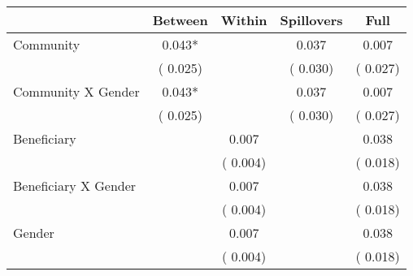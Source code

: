 
\begin{tabular}{l*{4}{c}}\hline&\multicolumn{1}{c}{Between}&\multicolumn{1}{c}{Within}&\multicolumn{1}{c}{Spillovers}&\multicolumn{1}{c}{Full}\\ \hline
 Community                                     &              0.043*      &                                               &        0.037 &         0.007                            \\ 
                                                       &        (       0.025)           &                                       &       (       0.030)     &      (       0.027)                                           \\ 
 Community X Gender            &              0.043*      &                                               &        0.037 &         0.007                            \\ 
                                                       &        (       0.025)           &                                       &       (       0.030)     &      (       0.027)                                           \\ 
 Beneficiary                           &                                               &        0.007    &                                &             0.038                            \\ 
                                                       &                                               & (       0.004)                  &                                        &      (       0.018)                                           \\ 
 Beneficiary X Gender          &                                               &        0.007    &                                &             0.038                            \\ 
                                                       &                                               & (       0.004)                  &                                        &      (       0.018)                                           \\ 
 Gender                                        &                              &        0.007    &                                &             0.038                            \\ 
                                                       &                                               & (       0.004)                  &                                        &      (       0.018)                                           \\ 

\end{tabular}
